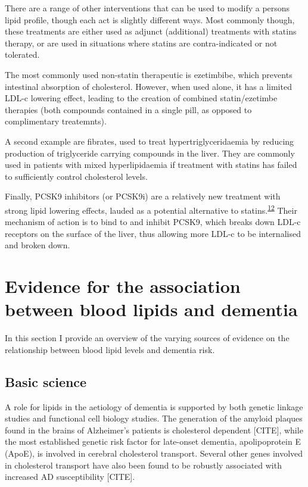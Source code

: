 \documentclass[a4paper, twoside]{templates/ociamthesis}
\begin{document}
There are a range of other interventions that can be used to modify a persons lipid profile, though each act is slightly different ways. Most commonly though, these treatments are either used as adjunct (additional) treatments with statins therapy, or are used in situations where statins are contra-indicated or not tolerated.

The most commonly used non-statin therapeutic is ezetimbibe, which prevents intestinal absorption of cholesterol. However, when used alone, it has a limited LDL-c lowering effect, leading to the creation of combined statin/ezetimbe therapies (both compounds contained in a single pill, as opposed to complimentary treatemnts).

A second example are fibrates, used to treat hypertriglyceridaemia by reducing production of triglyceride carrying compounds in the liver. They are commonly used in patients with mixed hyperlipidaemia if treatment with statins has failed to sufficiently control cholesterol levels.

Finally, PCSK9 inhibitors (or PCSK9i) are a relatively new treatment with strong lipid lowering effects, lauded as a potential alternative to statins.\textsuperscript{\protect\hyperlink{ref-chaudhary2017}{12}} Their mechanism of action is to bind to and inhibit PCSK9, which breaks down LDL-c receptors on the surface of the liver, thus allowing more LDL-c to be internalised and broken down.

\hypertarget{evidence-association}{%
\section{Evidence for the association between blood lipids and dementia}\label{evidence-association}}

In this section I provide an overview of the varying sources of evidence on the relationship between blood lipid levels and dementia risk.

\hypertarget{basic-science}{%
\subsection{Basic science}\label{basic-science}}

A role for lipids in the aetiology of dementia is supported by both genetic linkage studies and functional cell biology studies. The generation of the amyloid plaques found in the brains of Alzheimer's patients is cholesterol dependent {[}CITE{]}, while the most established genetic risk factor for late-onset dementia, apolipoprotein E (ApoE), is involved in cerebral cholesterol transport. Several other genes involved in cholesterol transport have also been found to be robustly associated with increased AD susceptibility {[}CITE{]}.
\end{document}
